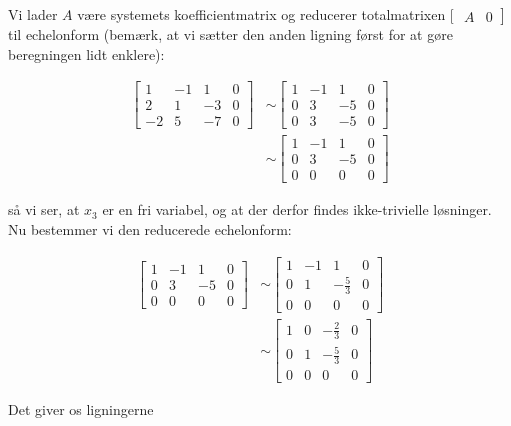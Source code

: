 \begin{solution}
    Vi lader $A$ være systemets koefficientmatrix og reducerer totalmatrixen [ $\left.\begin{array}{cc}A & 0\end{array}\right]$ til echelonform (bemærk, at vi sætter den anden ligning først for at gøre beregningen lidt enklere):

\[
\begin{aligned}
{\left[\begin{array}{cccc}
1 & -1 & 1 & 0 \\
2 & 1 & -3 & 0 \\
-2 & 5 & -7 & 0
\end{array}\right] } & \sim\left[\begin{array}{cccc}
1 & -1 & 1 & 0 \\
0 & 3 & -5 & 0 \\
0 & 3 & -5 & 0
\end{array}\right] \\
& \sim\left[\begin{array}{cccc}
1 & -1 & 1 & 0 \\
0 & 3 & -5 & 0 \\
0 & 0 & 0 & 0
\end{array}\right]
\end{aligned}
\]

så vi ser, at $x_3$ er en fri variabel, og at der derfor findes ikke-trivielle løsninger. Nu bestemmer vi den reducerede echelonform:

\[
\begin{aligned}
{\left[\begin{array}{cccc}
1 & -1 & 1 & 0 \\
0 & 3 & -5 & 0 \\
0 & 0 & 0 & 0
\end{array}\right] } & \sim\left[\begin{array}{cccc}
1 & -1 & 1 & 0 \\
0 & 1 & -\frac{5}{3} & 0 \\
0 & 0 & 0 & 0
\end{array}\right] \\
& \sim\left[\begin{array}{cccc}
1 & 0 & -\frac{2}{3} & 0 \\
0 & 1 & -\frac{5}{3} & 0 \\
0 & 0 & 0 & 0
\end{array}\right]
\end{aligned}
\]

Det giver os ligningerne


\end{solution}
